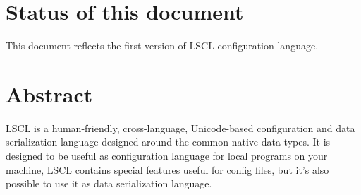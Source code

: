 






\large



\setcounter{page}{2}

\tableofcontents
\newpage
\listoffigures
\newpage
\lstlistoflistings
\newpage

\section{Status of this document}
This document reflects the first version of LSCL configuration language. 

\section{Abstract}
LSCL is a human-friendly, cross-language, Unicode-based configuration and data serialization language designed around the common native data types. It is designed to be useful as configuration language for local programs on your machine, LSCL contains special features useful for config files, but it's also possible to use it as data serialization language.

